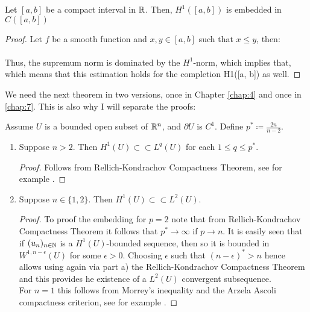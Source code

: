 \begin{atheorem}
	Let $[a, b]$ be a compact interval in $\mathbb{R}$. Then, $H^{1}([a, b])$ is embedded in $C([a, b])$
	
	\begin{proof}
		Let $f$ be a smooth function and $x, y \in [a, b]$ such that $x \leq y$, then:
		~\\ ~\\ %
		Thus, the supremum norm is dominated by the $H^{1}$-norm, which implies that, which means that this estimation holds for the completion H1([a, b]) as well.
	\end{proof}
\end{atheorem}

We need the next theorem in two versions, once in Chapter \ref{chap:4} and once in \ref{chap:7}. This is also why I will separate the proofs:

\begin{atheorem} \label{compact-embedding-theorem} %
Assume $U$ is a bounded open subset of $\mathbb{R}^{n}$, and $\partial U$ is $C^{1}$. Define $p^{*} \coloneqq \frac{2 n}{n - 2}$.
	\begin{enumerate}[label=\alph*\upshape)]
		\item Suppose $n > 2$. Then $H^{1}(U) \subset\subset L^{q}(U)$ for each $1 \leq q \leq p^{*}$.
		
			\begin{proof}
				Follows from Rellich-Kondrachov Compactness Theorem, see for example \cite[p. 272]{evans1998partial}.
			\end{proof}
		\item Suppose $n \in \{1, 2\}$. Then $H^{1}(U) \subset\subset L^{2}(U)$.
			\begin{proof} To proof the embedding for $p=2$ note that from Rellich-Kondrachov Compactness Theorem it follows that $p^{*} \rightarrow \infty$ if $p \rightarrow n$. It is easily seen that if $(u_{n})_{n \in \mathbb{N}}$ is a $H^{1}(U)$-bounded sequence, then so it is bounded in $W^{1, n-\epsilon}(U)$ for some $\epsilon > 0$. Choosing $\epsilon$ such that $(n - \epsilon)^{*} > n$ hence allows using again via part a) the Rellich-Kondrachov Compactness Theorem and  this provides he existence of a $L^{2}(U)$ convergent subsequence. ~\\
			For $n = 1$ this follows from Morrey's inequality and the Arzela Ascoli compactness criterion, see for example \cite[p. 274]{evans1998partial}.
			\end{proof}
	\end{enumerate}
\end{atheorem}

